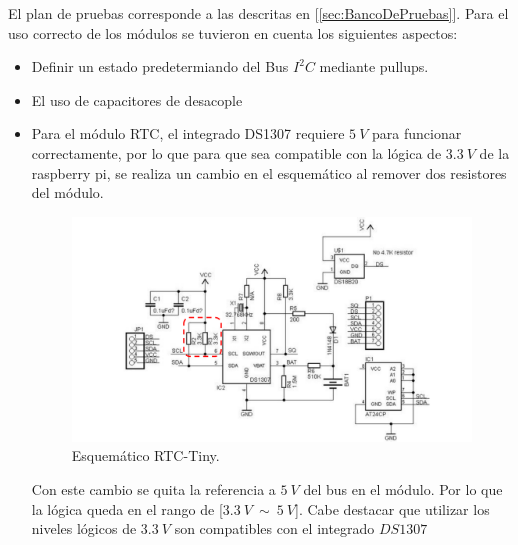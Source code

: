 El plan de pruebas corresponde a las descritas en [\ref{sec:BancoDePruebas}].
Para el uso correcto de los módulos se tuvieron en cuenta los siguientes aspectos:
\begin{itemize}
\item Definir un estado predetermiando del Bus $I^2C$ mediante pullups.
\item El uso de capacitores de desacople
\item Para el módulo RTC, el integrado DS1307 requiere $5 \ V$ para funcionar correctamente, por lo que para que sea compatible con la lógica de $3.3 \ V$ de la raspberry pi, se realiza un cambio en el esquemático al remover dos resistores del módulo.
\begin{figure}[H]
	\centering
	\includegraphics[width=0.9\linewidth,page=1]{ImagenesIngenieria de detalle/rtcTinySchematic}
	\caption{Esquemático RTC-Tiny.}
	\label{fig:RTCSchematic}
\end{figure}
Con este cambio se quita la referencia a $5 \ V$ del bus en el módulo. Por lo que la lógica queda en el rango de [$3.3 \ V \ \sim \ 5 \ V$].
Cabe destacar que utilizar los niveles lógicos de $3.3 \ V$ son compatibles con el integrado $DS1307$
\end{itemize}

